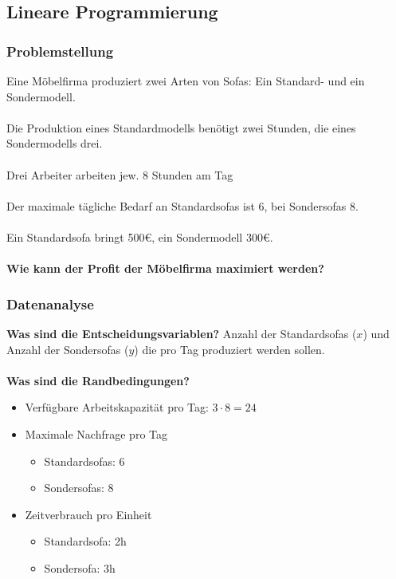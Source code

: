 \documentclass[handout]{beamer}
\begin{document}
  \subsection{Lineare Programmierung}
  \begin{frame}
    \frametitle{Problemstellung}

    Eine Möbelfirma produziert zwei Arten von Sofas: Ein Standard-
    und ein Sondermodell.
    \pause
    \\~\\

    Die Produktion eines Standardmodells benötigt zwei Stunden, die
    eines Sondermodells drei.
    \pause
    \\~\\

    Drei Arbeiter arbeiten jew. 8 Stunden am Tag
    \pause
    \\~\\

    Der maximale tägliche Bedarf an Standardsofas ist 6, bei
    Sondersofas 8.
    \pause
    \\~\\

    Ein Standardsofa bringt 500\euro, ein Sondermodell 300\euro.
    \pause
    \\~\\

    \textbf{Wie kann der Profit der Möbelfirma maximiert werden?}
  \end{frame}

  \begin{frame}
    \frametitle{Datenanalyse}

    \textbf{Was sind die Entscheidungsvariablen?}
    \linebreak
    \pause
    Anzahl der Standardsofas ($x$) und Anzahl der Sondersofas ($y$) die pro
    Tag produziert werden sollen.
    \pause
    \\~\\

    \textbf{Was sind die Randbedingungen?}
    \pause
    \begin{itemize}[<+->]
      \item Verfügbare Arbeitskapazität pro Tag: $3 \cdot 8 = 24$
      \item Maximale Nachfrage pro Tag
        \begin{itemize}
          \item Standardsofas: 6
          \item Sondersofas: 8 
        \end{itemize}
      \item Zeitverbrauch pro Einheit
        \begin{itemize}
          \item Standardsofa: 2h
          \item Sondersofa: 3h 
        \end{itemize}
    \end{itemize}
  \end{frame}
\end{document}
